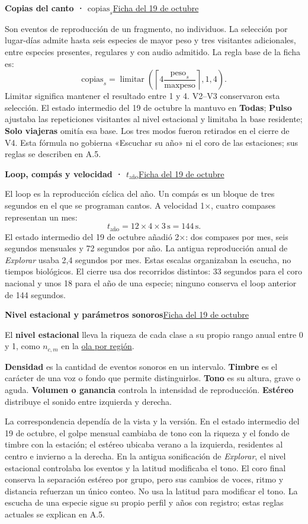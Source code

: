 \documentclass[11pt,a4paper]{article}
\newcommand{\Sitio}{https://canija2000.github.io/infovis_2026-2/}
\DeclareRobustCommand{\concepto}[2]{\hyperlink{concepto:#1}{\textcolor{acento}{#2}}}
\newcommand{\defhistorico}[3]{\par\needspace{6\baselineskip}\hypertarget{concepto:#1}{}\textbf{#2}\hfill\href{\Sitio prueba-antes-pr27/metricas.html\##3}{\textcolor{acento}{\footnotesize Ficha del 19 de octubre}}\par\nopagebreak}
\begin{document}
\defhistorico{copias}{Copias del canto · $\text{copias}_s$}{copias}
Son eventos de reproducción de un fragmento, no individuos. La selección por lugar-días admite hasta seis especies de mayor peso y tres visitantes adicionales, entre especies presentes, regulares y con audio admitido. La regla base de la ficha es:
\[
\text{copias}_s=\operatorname{limitar}\!\left(
\left\lceil4\frac{\text{peso}_s}{\max\text{peso}}\right\rceil,1,4\right).
\]
Limitar significa mantener el resultado entre 1 y 4. V2--V3 conservaron esta selección. El estado intermedio del 19 de octubre la mantuvo en \textbf{Todas}; \textbf{Pulso} ajustaba las repeticiones visitantes al nivel estacional y limitaba la base residente; \textbf{Solo viajeras} omitía esa base. Los tres modos fueron retirados en el cierre de V4. Esta fórmula no gobierna «Escuchar su año» ni el coro de las estaciones; sus reglas se describen en A.5.

\defhistorico{tiempo-sonoro}{Loop, compás y velocidad · $t_{\text{año}}$}{tiempo-sonoro}
El loop es la reproducción cíclica del año. Un compás es un bloque de tres segundos en el que se programan cantos. A velocidad 1×, cuatro compases representan un mes:
\[
t_{\text{año}}=12\times4\times3\,\text{s}=144\,\text{s}.
\]
El estado intermedio del 19 de octubre añadió 2×: dos compases por mes, seis segundos mensuales y 72 segundos por año. La antigua reproducción anual de \textit{Explorar} usaba 2,4 segundos por mes. Estas escalas organizaban la escucha, no tiempos biológicos. El cierre usa dos recorridos distintos: 33 segundos para el coro nacional y unos 18 para el año de una especie; ninguno conserva el loop anterior de 144 segundos.

\defhistorico{parametros-sonoros}{Nivel estacional y parámetros sonoros}{sonificacion-atlas}
El \textbf{nivel estacional} lleva la riqueza de cada clase a su propio rango anual entre 0 y 1, como $n_{c,m}$ en la \concepto{ola-regiones}{ola por región}.

\textbf{Densidad} es la cantidad de eventos sonoros en un intervalo. \textbf{Timbre} es el carácter de una voz o fondo que permite distinguirlos. \textbf{Tono} es su altura, grave o aguda. \textbf{Volumen o ganancia} controla la intensidad de reproducción. \textbf{Estéreo} distribuye el sonido entre izquierda y derecha.

La correspondencia dependía de la vista y la versión. En el estado intermedio del 19 de octubre, el golpe mensual cambiaba de tono con la riqueza y el fondo de timbre con la estación; el estéreo ubicaba verano a la izquierda, residentes al centro e invierno a la derecha. En la antigua sonificación de \textit{Explorar}, el nivel estacional controlaba los eventos y la latitud modificaba el tono. El coro final conserva la separación estéreo por grupo, pero sus cambios de voces, ritmo y distancia refuerzan un único conteo. No usa la latitud para modificar el tono. La escucha de una especie sigue su propio perfil y años con registro; estas reglas actuales se explican en A.5.
\end{document}
